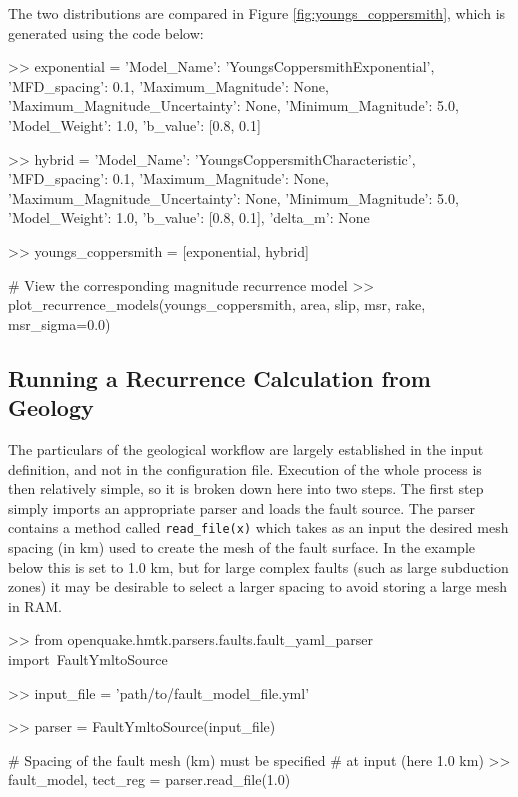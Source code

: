 The two \textcite{YoungsCoppersmith1985} distributions are compared in Figure \ref{fig:youngs_coppersmith}, which is generated using the code below:
\begin{python}[frame=single]
>> exponential = {'Model_Name': 'YoungsCoppersmithExponential',
                  'MFD_spacing': 0.1,
                  'Maximum_Magnitude': None,
                  'Maximum_Magnitude_Uncertainty': None,
                  'Minimum_Magnitude': 5.0,
                  'Model_Weight': 1.0,
                  'b_value': [0.8, 0.1]}

>> hybrid = {'Model_Name': 'YoungsCoppersmithCharacteristic',
             'MFD_spacing': 0.1,
             'Maximum_Magnitude': None,
             'Maximum_Magnitude_Uncertainty': None,
             'Minimum_Magnitude': 5.0,
             'Model_Weight': 1.0,
             'b_value': [0.8, 0.1],
             'delta_m': None}

>> youngs_coppersmith = [exponential, hybrid]

# View the corresponding magnitude recurrence model
>> plot_recurrence_models(youngs_coppersmith,
                          area,
                          slip,
                          msr,
                          rake,
                          msr_sigma=0.0)
\end{python}

\subsection{Running a Recurrence Calculation from Geology}

The particulars of the geological workflow are largely established in the input definition, and not in the configuration file. Execution of the whole process is then relatively simple, so it is broken down here into two steps. The first step simply imports an appropriate parser and loads the fault source. The parser contains a method called \verb=read_file(x)= which takes as an input the desired mesh spacing (in km) used to create the mesh of the fault surface. In the example below this is set to 1.0 km, but for large complex faults (such as large subduction zones) it may be desirable to select a larger spacing to avoid storing a large mesh in RAM.

\begin{python}[frame=single]
>> from openquake.hmtk.parsers.faults.fault_yaml_parser import\
    FaultYmltoSource

>> input_file = 'path/to/fault_model_file.yml'

>> parser = FaultYmltoSource(input_file)

# Spacing of the fault mesh (km) must be specified 
# at input (here 1.0 km) 
>> fault_model, tect_reg = parser.read_file(1.0)
\end{python}

